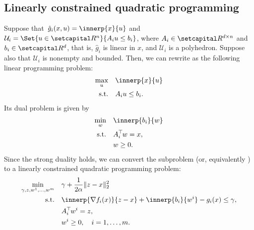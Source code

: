\documentclass[../../main]{subfiles}
\begin{document}
\subsection{Linearly constrained quadratic programming} 
Suppose that~$\hat{g}_i (x,u) = \innerp{x}{u}$ and ${\mathcal{U}}_i = \Set{ u \in \setR^n }{ A_i u \le b_i }$, where $A_i \in \setR^{d \times n}$ and $b_i \in \setR^d$, that is, $\hat{g}_i$ is linear in $x$, and $\mathcal{U}_i$ is a polyhedron. Suppose also that $\mathcal{U}_i$ is nonempty and bounded.
Then, we can rewrite  as the following linear programming problem:
\begin{align}\label{eq:lp}
\begin{aligned}
\max_u \quad   & \innerp{x}{u} \\ 
\st    \quad   & A_i u \le b_i.
\end{aligned}
\end{align}
Its dual problem is given by
\begin{align}
\begin{aligned}
\min_w \quad   & \innerp{b_i}{w} \\ 
\st    \quad   & A_i^\T w = x, \\
&w \geq 0.
\end{aligned}
\end{align}
Since the strong duality holds, we can convert the subproblem  (or, equivalently ) to a linearly constrained quadratic programming problem:
\begin{align}\label{eq:qp}
\begin{aligned}
\min_{\gamma, z, w^1, \dots, w^m} \quad   &\gamma + \frac{1}{2 \alpha}\norm{z - x}_2^2  \\ 
\st    \quad   &\innerp{\nabla f_i(x)}{z - x} + \innerp{b_i}{w^i} - g_i(x) \le \gamma, \\
& A_i^\T w^i = z, \\
&w^i \geq 0, \quad i = 1,\dots,m.
\end{aligned}
\end{align}
\end{document}
